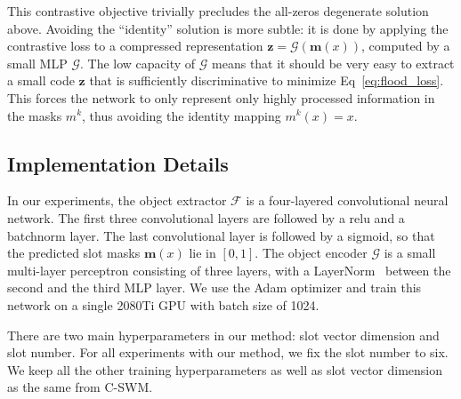 \documentclass{article}
\newcommand{\jd}[1]{\textcolor{orange}{[DJ: #1]}}
\begin{document}
This contrastive objective trivially precludes the all-zeros degenerate solution above. Avoiding the ``identity'' solution is more subtle: it is done by applying the contrastive loss to a compressed representation $\bm{z}=\mathcal{G}(\bm{m}(x))$, computed by a small MLP $\mathcal{G}$. The low capacity of $\mathcal{G}$ means that it should be very easy to extract a small code $\bm{z}$ that is sufficiently discriminative to minimize Eq~\ref{eq:flood_loss}. This forces the network to only represent only highly processed information in the masks $m^k$, thus avoiding the identity mapping $m^k(x)=x$. 

\subsection{Implementation Details}

In our experiments, the object extractor $\mathcal{F}$ is a four-layered convolutional neural network. The first three convolutional layers are followed by a relu and a batchnorm layer. The last convolutional layer is followed by a sigmoid, so that the predicted slot masks $\bm{m}(x)$ lie in $[0,1]$.  %
The object encoder $\mathcal{G}$ is a small multi-layer perceptron 
consisting of three layers, with a LayerNorm~\cite{LayerN} between the second and the third MLP layer. We use the Adam optimizer and train this network on a single 2080Ti GPU with batch size of 1024. 

There are two main hyperparameters in our method: slot vector dimension and slot number. For all experiments with our method, we fix the slot number to six. We keep all the other training hyperparameters as well as slot vector dimension as the same from C-SWM.





\end{document}
